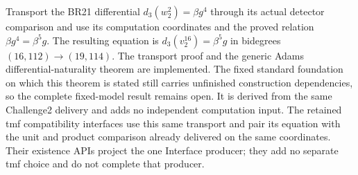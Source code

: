 \begin{theorem}
  \label{thm:main-tmf-br21-coordinate-differential}
  \notready
  Transport the BR21 differential
  $d_3(w_2^2)=\beta g^4$ through its actual detector comparison and use
  its computation coordinates and the proved relation
  $\beta g^4=\beta^5g$. The resulting equation is
  $d_3(v_2^{16})=\beta^5g$ in bidegrees
  $(16,112)\to(19,114)$. The transport proof and the generic Adams
  differential-naturality theorem are implemented. The fixed standard
  foundation on which this theorem is stated still carries unfinished
  construction dependencies, so the complete fixed-model result remains
  open. It is derived from the same Challenge2 delivery and adds no
  independent computation input.
  The retained tmf compatibility interfaces use this same transport and
  pair its equation with the unit and product comparison already delivered
  on the same coordinates. Their existence APIs project the one Interface
  producer; they add no separate tmf choice and do not complete that producer.
\end{theorem}

